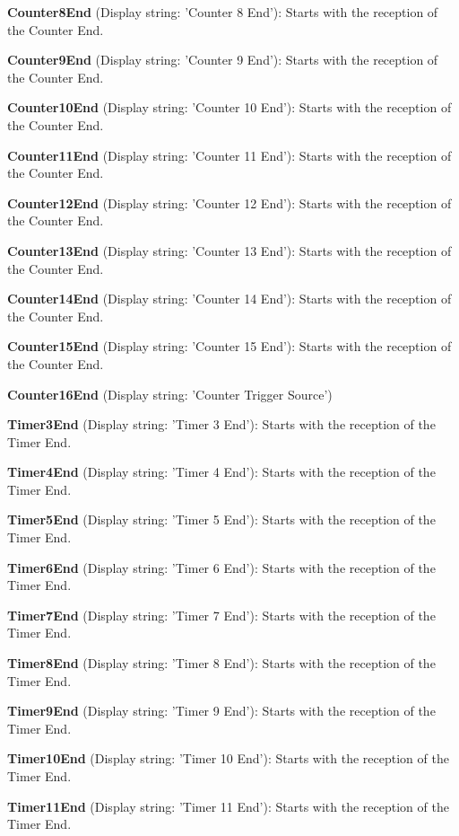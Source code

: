 \begin{DoxyItemize}
\item {\bfseries Counter8\+End} (Display string\+: 'Counter 8 End')\+: Starts with the reception of the Counter End.
\item {\bfseries Counter9\+End} (Display string\+: 'Counter 9 End')\+: Starts with the reception of the Counter End.
\item {\bfseries Counter10\+End} (Display string\+: 'Counter 10 End')\+: Starts with the reception of the Counter End.
\item {\bfseries Counter11\+End} (Display string\+: 'Counter 11 End')\+: Starts with the reception of the Counter End.
\item {\bfseries Counter12\+End} (Display string\+: 'Counter 12 End')\+: Starts with the reception of the Counter End.
\item {\bfseries Counter13\+End} (Display string\+: 'Counter 13 End')\+: Starts with the reception of the Counter End.
\item {\bfseries Counter14\+End} (Display string\+: 'Counter 14 End')\+: Starts with the reception of the Counter End.
\item {\bfseries Counter15\+End} (Display string\+: 'Counter 15 End')\+: Starts with the reception of the Counter End.
\item {\bfseries Counter16\+End} (Display string\+: 'Counter Trigger Source')
\item {\bfseries Timer3\+End} (Display string\+: 'Timer 3 End')\+: Starts with the reception of the Timer End.
\item {\bfseries Timer4\+End} (Display string\+: 'Timer 4 End')\+: Starts with the reception of the Timer End.
\item {\bfseries Timer5\+End} (Display string\+: 'Timer 5 End')\+: Starts with the reception of the Timer End.
\item {\bfseries Timer6\+End} (Display string\+: 'Timer 6 End')\+: Starts with the reception of the Timer End.
\item {\bfseries Timer7\+End} (Display string\+: 'Timer 7 End')\+: Starts with the reception of the Timer End.
\item {\bfseries Timer8\+End} (Display string\+: 'Timer 8 End')\+: Starts with the reception of the Timer End.
\item {\bfseries Timer9\+End} (Display string\+: 'Timer 9 End')\+: Starts with the reception of the Timer End.
\item {\bfseries Timer10\+End} (Display string\+: 'Timer 10 End')\+: Starts with the reception of the Timer End.
\item {\bfseries Timer11\+End} (Display string\+: 'Timer 11 End')\+: Starts with the reception of the Timer End.

\end{DoxyItemize}
